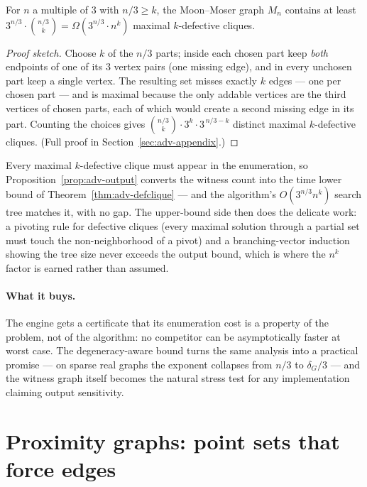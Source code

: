 \begin{lemma}\label{lem:adv-mmcount}
For $n$ a multiple of $3$ with $n/3 \ge k$, the Moon--Moser graph $M_n$ contains at least
$3^{n/3}\cdot\binom{n/3}{k} = \Omega(3^{n/3}\cdot n^k)$ maximal $k$-defective cliques. \eop
\end{lemma}

\begin{proof}[Proof sketch]
Choose $k$ of the $n/3$ parts; inside each chosen part keep \emph{both} endpoints of one of its
$3$ vertex pairs (one missing edge), and in every unchosen part keep a single vertex. The
resulting set misses exactly $k$ edges --- one per chosen part --- and is maximal because the
only addable vertices are the third vertices of chosen parts, each of which would create a
second missing edge in its part. Counting the choices gives
$\binom{n/3}{k}\cdot 3^{k} \cdot 3^{\,n/3-k}$ distinct maximal $k$-defective cliques. (Full
proof in Section~\ref{sec:adv-appendix}.)
\end{proof}

Every maximal $k$-defective clique must appear in the enumeration, so
Proposition~\ref{prop:adv-output} converts the witness count into the time lower bound of
Theorem~\ref{thm:adv-defclique} --- and the algorithm's $O(3^{n/3} n^k)$ search tree matches it,
with no gap. The upper-bound side then does the delicate work: a pivoting rule for defective
cliques (every maximal solution through a partial set must touch the non-neighborhood of a
pivot) and a branching-vector induction showing the tree size never exceeds the output bound,
which is where the $n^k$ factor is earned rather than assumed.

\paragraph{What it buys.}
The engine gets a certificate that its enumeration cost is a property of the problem, not of
the algorithm: no competitor can be asymptotically faster at worst case. The degeneracy-aware
bound turns the same analysis into a practical promise --- on sparse real graphs the exponent
collapses from $n/3$ to $\delta_G/3$ --- and the witness graph itself becomes the natural
stress test for any implementation claiming output sensitivity.

\section{Proximity graphs: point sets that force edges}
\label{sec:adv-proxgraph}

